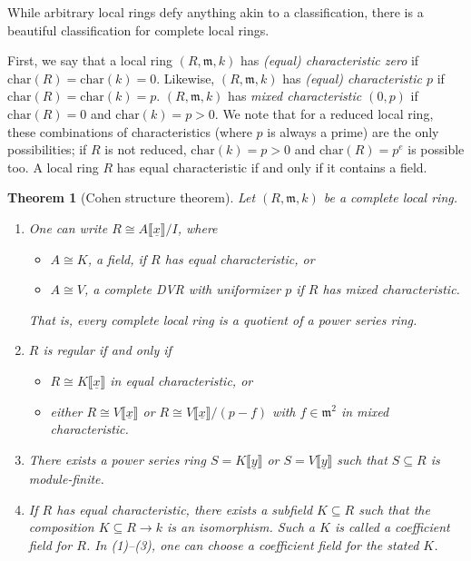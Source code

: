 \documentclass[11pt]{book}
\newtheorem{theorem}{Theorem}[chapter]
\numberwithin{equation}{section}
\numberwithin{theorem}{chapter}
\theoremstyle{definition}
\newtheorem*{basic properties}{Basic Properties}
\newtheorem*{Important Remark}{Important Remark}
\theoremstyle{remark}
\newcommand{\m}{\mathfrak{m}}
\begin{document}
While arbitrary local rings defy anything akin to a classification, there is a beautiful classification for complete local rings.

First, we say that a local ring $(R,\m,k)$ has \emph{(equal) characteristic zero} if $\mathrm{char}(R)=\mathrm{char}(k)=0$. Likewise, $(R,\m,k)$ has \emph{(equal) characteristic $p$} if $\mathrm{char}(R)=\mathrm{char}(k)=p$. $(R,\m,k)$ has \emph{mixed characteristic $(0,p)$} if $\mathrm{char}(R)=0$ and $\mathrm{char}(k)=p>0$. We note that for a reduced local ring, these combinations of characteristics (where $p$ is always a prime) are the only possibilities; if $R$ is not reduced, $\mathrm{char}(k)=p>0$ and $\mathrm{char}(R)=p^e$ is possible too. A local ring $R$ has equal characteristic if and only if it contains a field.

\begin{theorem}[Cohen structure theorem]
	Let $(R,\m,k)$ be a complete local ring.
	\begin{enumerate}
		\item One can write $R\cong A\llbracket\underline{x}\rrbracket /I$, where
		\begin{itemize}
			\item $A\cong K$, a field, if $R$ has equal characteristic, or
			\item $A \cong V$, a complete DVR with uniformizer $p$ if $R$ has mixed characteristic.
		\end{itemize} That is, every complete local ring is a quotient of a power series ring.
		\item $R$ is regular if and only if
		\begin{itemize}
			\item $R\cong K\llbracket\underline{x}\rrbracket$ in equal characteristic, or
			\item either $R\cong V\llbracket\underline{x}\rrbracket$ or $R\cong V\llbracket\underline{x}\rrbracket/(p-f)$ with $f\in \m^2$ in mixed characteristic.
		\end{itemize}
	\item There exists a power series ring $S=K\llbracket\underline{y}\rrbracket$ or $S=V\llbracket\underline{y}\rrbracket$ such that $S\subseteq R$ is module-finite.
	\item If $R$ has equal characteristic, there exists a subfield $K\subseteq R$ such that the composition ${K\subseteq R \to k}$ is an isomorphism. Such a $K$ is called a \emph{coefficient field} for $R$. In (1)--(3), one can choose a coefficient field for the stated $K$.
	\end{enumerate}
\end{theorem}
\end{document}
